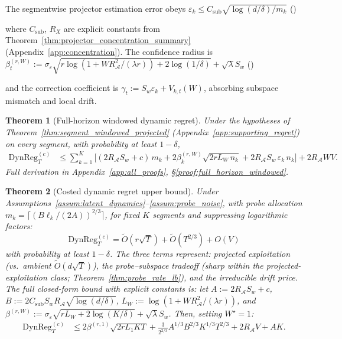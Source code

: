 \documentclass{article}
\newcommand{\cA}{\mathcal{A}}
\newcommand{\DynReg}{\mathrm{DynReg}}
\newtheorem{theorem}{Theorem}
\begin{document}
  The segmentwise projector estimation error obeys
  $\varepsilon_k \le C_{\mathrm{sub}} \sqrt{\log(d/\delta)/m_k}$
  \hfill{}(\theequation)\label{eq:eps_k_rate}

  \noindent where $C_{\mathrm{sub}}$, $R_X$ are explicit constants from Theorem~\ref{thm:projector_concentration_summary} (Appendix~\ref{app:concentration}).
  The confidence radius is $\beta_t^{(r,W)} := \sigma_\varepsilon\sqrt{r \log(1+WR_{\cA}^2/(\lambda r)) + 2\log(1/\delta)} + \sqrt{\lambda}S_w$
  \hfill{}(\theequation)\label{eq:beta_rW}

  \noindent and the correction coefficient is $\gamma_t := S_w\varepsilon_k + V_{k,t}(W)$, absorbing subspace mismatch and local drift.

    \begin{theorem}[Full-horizon windowed dynamic regret]
    \label{thm:full_horizon_windowed}
    Under the hypotheses of Theorem~\ref{thm:segment_windowed_projected} (Appendix~\ref{app:supporting_regret}) on every segment,
    with probability at least $1-\delta$,
    \begin{align*}
    \DynReg_T^{(c)} &\le
      \sum_{k=1}^K \bigl[
        (2R_{\cA}S_w + c)\,m_k
        + 2\beta_k^{(r,W)}\sqrt{2rL_W\, n_k}
        + 2R_{\cA}S_w\,\varepsilon_k\, n_k
      \bigr]
      + 2R_{\cA} W V.
    \end{align*}
    Full derivation in Appendix~\ref{app:all_proofs}, \S\ref{proof:full_horizon_windowed}.
    \end{theorem}


  \begin{theorem}[Costed dynamic regret upper bound]
  \label{thm:closed_dynamic_regret}
  Under Assumptions~\ref{assum:latent_dynamics}--\ref{assum:probe_noise}, with probe allocation
  $m_k = \lceil (B\ell_k/(2A))^{2/3} \rceil$,
  for fixed $K$ segments and suppressing logarithmic factors:
  \begin{equation}
  \boxed{\;
  \DynReg_T^{(c)} = \widetilde O\!\left(r\sqrt{T}\right) + \widetilde O\!\left(T^{2/3}\right) + O(V)
  \;}
  \label{eq:closed_bound_simplified}
  \end{equation}
  with probability at least $1-\delta$. The three terms represent:
  \emph{projected exploitation} (vs.\ ambient $\widetilde O(d\sqrt{T})$),
  the \emph{probe--subspace tradeoff} (sharp within the projected-exploitation class; Theorem~\ref{thm:probe_rate_lb}),
  and the \emph{irreducible drift price}.
  The full closed-form bound with explicit constants is:
  let $A := 2R_{\cA} S_w + c$, $B := 2 C_{\mathrm{sub}} S_w R_{\cA} \sqrt{\log(d/\delta)}$,
  $L_W := \log(1+WR_{\cA}^2/(\lambda r))$, and
  $\beta^{(r,W)} := \sigma_\varepsilon\sqrt{rL_W + 2\log(K/\delta)} + \sqrt{\lambda}S_w$.
  Then, setting $W^\star = 1$:
  \begin{align}
  \DynReg_T^{(c)}
  &\le
  2\beta^{(r,1)} \sqrt{2rL_1KT}
  + \frac{3}{2^{2/3}} A^{1/3} B^{2/3} K^{1/3} T^{2/3}
  + 2R_{\cA} V + A K.
  \label{eq:closed_bound_final}
  \end{align}
  \end{theorem}
\end{document}
